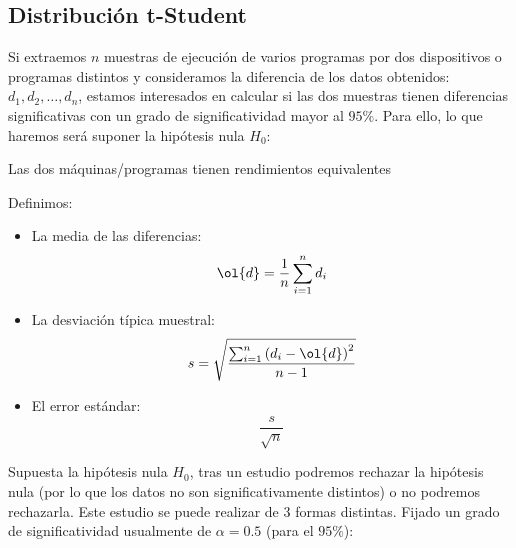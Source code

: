\subsection{Distribución t-Student}
Si extraemos $n$ muestras de ejecución de varios programas por dos dispositivos o programas distintos y consideramos la diferencia de los datos obtenidos: $d_1,d_2,\ldots,d_n$, estamos interesados en calcular si las dos muestras tienen diferencias significativas con un grado de significatividad mayor al $95\%$. Para ello, lo que haremos será suponer la hipótesis nula $H_0$:
\begin{center}
    Las dos máquinas/programas tienen rendimientos equivalentes
\end{center}
Definimos:
\begin{itemize}
    \item La media de las diferencias:
        \begin{equation*}
            \ol{d} = \dfrac{1}{n}\sum_{i=1}^{n}d_i
        \end{equation*}
    \item La desviación típica muestral:
        \begin{equation*}
            s = \sqrt{\dfrac{\sum_{i=1}^{n}{(d_i - \ol{d})}^{2}}{n-1}}
        \end{equation*}
    \item El error estándar:
        \begin{equation*}
            \dfrac{s}{\sqrt{n}}
        \end{equation*}
\end{itemize}
Supuesta la hipótesis nula $H_0$, tras un estudio podremos rechazar la hipótesis nula (por lo que los datos no son significativamente distintos) o no podremos rechazarla. Este estudio se puede realizar de 3 formas distintas. Fijado un grado de significatividad usualmente de $\alpha=0.5$ (para el $95\%$):
